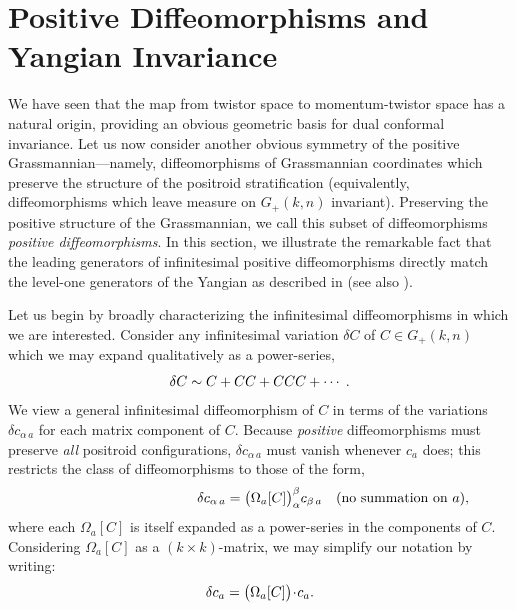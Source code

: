 \documentclass[12pt,hyperref,compress]{JHEP3}
\newcommand{\eq}[1]{\begin{equation}#1\end{equation}}
\begin{document}
{\newpage
\section{Positive Diffeomorphisms and Yangian Invariance}\label{positive_diffeos_and_the_yangian_section}

We have seen that the map from twistor space to momentum-twistor space has a natural origin, providing an obvious geometric basis for dual conformal invariance. Let us now consider another obvious symmetry of the positive Grassmannian---namely, diffeomorphisms of Grassmannian coordinates which preserve the structure of the positroid stratification (equivalently, diffeomorphisms which leave measure on $G_+(k,n)$ invariant). Preserving the positive structure of the Grassmannian, we call this subset of diffeomorphisms {\it positive diffeomorphisms}. In this section, we illustrate the remarkable fact that the leading generators of infinitesimal positive diffeomorphisms directly match the level-one generators of the Yangian as described in \cite{Drummond:2010uq} (see also \cite{Drummond:2009fd,Drummond:2010qh,Korchemsky:2010ut,Beisert:2010gn}).

Let us begin by broadly characterizing the infinitesimal diffeomorphisms in which we are interested. Consider any infinitesimal variation $\delta C$ of $C\!\in\!G_+(k,n)$ which we may expand qualitatively as a power-series,
\vspace{-.2cm}\eq{\delta C  \sim C + C C + C C C + \cdots\;.\label{general_c_diffeo}\vspace{-.2cm}} We view a general infinitesimal diffeomorphism of $C$ in terms of the variations $\delta c_{\alpha\,a}$ for each matrix component of $C$. Because {\it positive} diffeomorphisms must preserve {\it all} positroid configurations, $\delta c_{\alpha\,a}$ must vanish whenever $c_a$ does; this restricts the class of diffeomorphisms to those of the form,
\vspace{-.2cm}\eq{\phantom{\text{(no summation on $a$),}}\quad\delta c_{\alpha\,a}=\big(\Omega_a[C]\big)_{\alpha}^{\beta}c_{\beta\,a}\quad\text{(no summation on $a$),}\vspace{-.2cm}\label{general_positive_diffeomorphism}}
where
each $\Omega_a[C]$ is itself expanded as a power-series in the components of $C$. Considering $\Omega_a[C]$ as a $(k\!\times\!k)$-matrix, we may simplify our notation by writing:
\vspace{-.2cm}\eq{\delta c_{a}=\big(\Omega_a[C]\big)\!\cdot\!c_{a}.\vspace{-.2cm}\label{general_positive_diffeomorphism_v2}}

}
\end{document}
